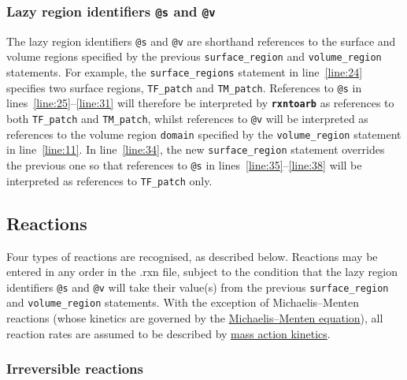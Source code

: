 \documentclass[fontsize=12pt,
               captions=abovetable,
               numbers=noenddot,
              ]{scrartcl}
\newcommand{\rxntoarb}{\texttt{\textbf{rxntoarb}}}
\newcommand{\syntax}[2]{\textcolor{#1}{\texttt{#2}}}
\newcommand{\lnum}[1]{line~\ref{line:#1}}
\newcommand{\lnums}[2]{lines~\ref{line:#1}--\ref{line:#2}}
\begin{document}
\subsubsection{Lazy region identifiers \syntax{special}{@s} and \syntax{special}{@v} \label{s:lazy}}

The lazy region identifiers \syntax{special}{@s} and \syntax{special}{@v} are shorthand references to the surface and volume regions specified by the previous \syntax{statement}{surface\_region} and \syntax{statement}{volume\_region} statements. For example, the \syntax{statement}{surface\_regions} statement in \lnum{24} specifies two surface regions, \texttt{TF\_patch} and \texttt{TM\_patch}. References to \syntax{special}{@s} in \lnums{25}{31} will therefore be interpreted by \rxntoarb{} as references to both \texttt{TF\_patch} and \texttt{TM\_patch}, whilst references to \syntax{special}{@v} will be interpreted as references to the volume region \texttt{domain} specified by the \syntax{statement}{volume\_region} statement in \lnum{11}. In \lnum{34}, the new \syntax{statement}{surface\_region} statement overrides the previous one so that references to \syntax{special}{@s} in \lnums{35}{38} will be interpreted as references to \texttt{TF\_patch} only.

\subsection{Reactions \label{s:reactions}}

Four types of reactions are recognised, as described below. Reactions may be entered in any order in the .rxn file, subject to the condition that the lazy region identifiers \syntax{special}{@s} and \syntax{special}{@v} will take their value(s) from the previous \syntax{statement}{surface\_region} and \syntax{statement}{volume\_region} statements. With the exception of Michaelis--Menten reactions (whose kinetics are governed by the \href{https://en.wikipedia.org/wiki/Michaelis\%E2\%80\%93Menten_kinetics}{Michaelis--Menten equation}), all reaction rates are assumed to be described by \href{https://en.wikipedia.org/wiki/Law_of_mass_action}{mass action kinetics}.

\subsubsection{Irreversible reactions}
\end{document}
